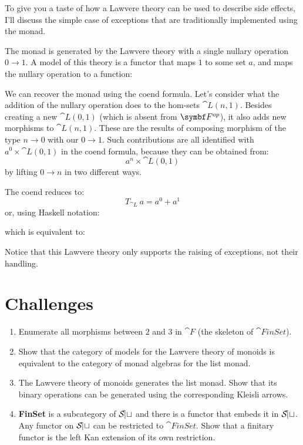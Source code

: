 To give you a taste of how a Lawvere theory can be used to describe side
effects, I'll discuss the simple case of exceptions that are
traditionally implemented using the  monad.

The  monad is generated by the Lawvere theory with a
single nullary operation $0 \to 1$. A model of this
theory is a functor that maps $1$ to some set $a$, and
maps the nullary operation to a function:

We can recover the  monad using the coend formula. Let's
consider what the addition of the nullary operation does to the hom-sets
$\cat{L}(n, 1)$. Besides creating a new $\cat{L}(0, 1)$ (which is
absent from $\Fop$), it also adds new morphisms
to $\cat{L}(n, 1)$. These are the results of composing morphism of the
type $n \to 0$ with our $0 \to 1$.
Such contributions are all identified with $a^0 \times \cat{L}(0, 1)$ in
the coend formula, because they can be obtained from:
\[a^n \times \cat{L}(0, 1)\]
by lifting $0 \to n$ in two different ways.

\begin{figure}[H]
\centering
{}
\end{figure}

\noindent
The coend reduces to:
\[T_{\cat{L}}\ a = a^0 + a^1\]
or, using Haskell notation:

which is equivalent to:

Notice that this Lawvere theory only supports the raising of exceptions,
not their handling.

\section{Challenges}

\begin{enumerate}
\tightlist
\item
  Enumerate all morphisms between $2$ and $3$ in $\cat{F}$ (the skeleton of
  $\cat{FinSet}$).
\item
  Show that the category of models for the Lawvere theory of monoids is
  equivalent to the category of monad algebras for the list monad.
\item
  The Lawvere theory of monoids generates the list monad. Show that its
  binary operations can be generated using the corresponding Kleisli
  arrows.
\item
  \textbf{FinSet} is a subcategory of $\mathcal{S\mkern-3mu et}$ and there is a
  functor that embeds it in $\mathcal{S\mkern-3mu et}$. Any functor on $\mathcal{S\mkern-3mu et}$
  can be restricted to $\cat{FinSet}$. Show that a finitary functor is
  the left Kan extension of its own restriction.
\end{enumerate}

